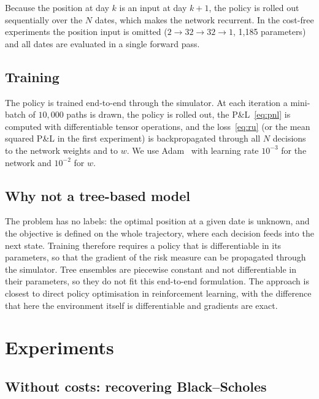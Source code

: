 \documentclass[11pt,a4paper]{article}
\begin{document}
Because the position at day $k$ is an input at day $k+1$, the policy is rolled out sequentially
over the $N$ dates, which makes the network recurrent. In the cost-free experiments the
position input is omitted ($2 \to 32 \to 32 \to 1$, 1{,}185 parameters) and all dates are
evaluated in a single forward pass.

\subsection{Training}

The policy is trained end-to-end through the simulator. At each iteration a mini-batch of
$10{,}000$ paths is drawn, the policy is rolled out, the P\&L~\eqref{eq:pnl} is computed with
differentiable tensor operations, and the loss~\eqref{eq:ru} (or the mean squared P\&L in the
first experiment) is backpropagated through all $N$ decisions to the network weights and to $w$.
We use Adam~\cite{kingma2015} with learning rate $10^{-3}$ for the network and $10^{-2}$ for $w$.

\subsection{Why not a tree-based model}

The problem has no labels: the optimal position at a given date is unknown, and the objective
is defined on the whole trajectory, where each decision feeds into the next state. Training
therefore requires a policy that is differentiable in its parameters, so that the gradient of
the risk measure can be propagated through the simulator. Tree ensembles are piecewise constant
and not differentiable in their parameters, so they do not fit this end-to-end formulation.
The approach is closest to direct policy optimisation in reinforcement learning, with the
difference that here the environment itself is differentiable and gradients are exact.

\section{Experiments}

\subsection{Without costs: recovering Black--Scholes}
\end{document}
